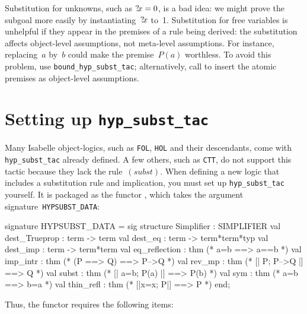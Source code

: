 Substitution for unknowns, such as ${?\!x}=0$, is a bad idea: we might prove
the subgoal more easily by instantiating~${?\!x}$ to~1.
Substitution for free variables is unhelpful if they appear in the
premises of a rule being derived: the substitution affects object-level
assumptions, not meta-level assumptions.  For instance, replacing~$a$
by~$b$ could make the premise~$P(a)$ worthless.  To avoid this problem, use
\texttt{bound_hyp_subst_tac}; alternatively, call  to
insert the atomic premises as object-level assumptions.


\section{Setting up {\tt hyp_subst_tac}} 
Many Isabelle object-logics, such as \texttt{FOL}, \texttt{HOL} and their
descendants, come with \texttt{hyp_subst_tac} already defined.  A few others,
such as \texttt{CTT}, do not support this tactic because they lack the
rule~$(subst)$.  When defining a new logic that includes a substitution
rule and implication, you must set up \texttt{hyp_subst_tac} yourself.  It
is packaged as the \ML{} functor , which takes the
argument signature~\texttt{HYPSUBST_DATA}:
\begin{ttbox} 
signature HYPSUBST_DATA =
  sig
  structure Simplifier : SIMPLIFIER
  val dest_Trueprop    : term -> term
  val dest_eq          : term -> term*term*typ
  val dest_imp         : term -> term*term
  val eq_reflection    : thm             (* a=b ==> a==b *)
  val imp_intr         : thm             (* (P ==> Q) ==> P-->Q *)
  val rev_mp           : thm             (* [| P;  P-->Q |] ==> Q *)
  val subst            : thm             (* [| a=b;  P(a) |] ==> P(b) *)
  val sym              : thm             (* a=b ==> b=a *)
  val thin_refl        : thm             (* [|x=x; P|] ==> P *)
  end;
\end{ttbox}
Thus, the functor requires the following items:
